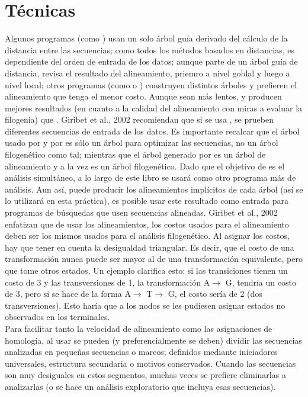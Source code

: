 \section{T\'ecnicas}
Algunos programas (como ) usan un solo \'arbol gu\'ia derivado del c\'alculo de la distancia entre las 
secuencias; como todos los m\'etodos basados en distancias, es dependiente del orden de entrada de los datos;  aunque parte de un \'arbol gu\'ia de  distancia, revisa el resultado del alineamiento, priemro a nivel goblal y luego a nivel local; otros 
programas (como  o ) construyen distintos \'arboles y prefieren el alineamiento que tenga el menor 
costo. Aunque sean m\'as lentos,  y  producen mejores resultados (en cuanto a la calidad del 
alineamiento con miras a evaluar la filogenia) que . Giribet et al., 2002 recomiendan que si se usa 
, se prueben diferentes secuencias de entrada de los datos. Es importante recalcar que el \'arbol usado por 
 y por  es s\'olo un \'arbol para optimizar las secuencias, no un \'arbol filogen\'etico como tal; 
mientras que el \'arbol generado por  es un \'arbol de alineamiento y a la vez es un \'arbol filogen\'etico. Dado que el objetivo de  es el an\'alisis simult\'aneo, a lo largo de este libro se usar\'a  como otro programa m\'as de an\'alisis. Aun as\'i,  puede producir los alineamientos impl\'icitos de cada \'arbol (as\'i se lo utilizar\'a en esta pr\'actica), es posible usar este resultado como entrada para programas de b\'usquedas que usen secuencias alineadas. Giribet 
et al., 2002 enfatizan que de usar los alineamientos, los costos usados para el alineamiento deben ser los mismos usados 
para el an\'alisis filogen\'etico. Al asignar los costos, hay que tener en cuenta la desigualdad triangular. Es decir, que el 
costo de una transformaci\'on nunca puede ser mayor al de una transformaci\'on equivalente, pero que tome otros estados. 
Un ejemplo clarifica esto: si las transiciones tienen un costo de 3 y las transversiones de 1, la transformaci\'on 
A$\rightarrow$ G, tendr\'ia un costo de 3, pero si se hace de la forma A$\rightarrow$ T$\rightarrow$ G, el costo ser\'ia de 
2 (dos transversiones). Esto har\'ia que a los nodos se les pudiesen asignar estados no observados en los terminales.\\
Para facilitar tanto la velocidad de alineamiento como las asignaciones de homolog\'ia, al usar  se pueden 
(y preferencialmente se deben) dividir las secuencias analizadas en peque\~nas secuencias o marcos; definidos mediante 
iniciadores universales, estructura secundaria o motivos conservados. Cuando las secuencias son muy desiguales en estos 
segmentos, muchas veces se prefiere eliminarlas a analizarlas (o se hace un an\'alisis exploratorio que incluya esas 
secuencias).
